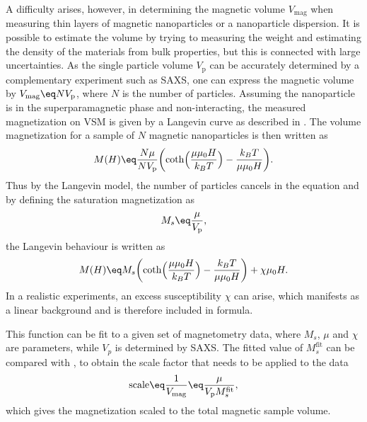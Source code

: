 \documentclass[\main/dresen_thesis.tex]{subfiles}
\begin{document}
    A difficulty arises, however, in determining the magnetic volume $V_\mathrm{mag}$ when measuring thin layers of magnetic nanoparticles or a nanoparticle dispersion.
    It is possible to estimate the volume by trying to measuring the weight and estimating the density of the materials from bulk properties, but this is connected with large uncertainties.
    As the single particle volume $V_\mathrm{p}$ can be accurately determined by a complementary experiment such as SAXS, one can express the magnetic volume by $V_\mathrm{mag} \eq N V_\mathrm{p}$, where $N$ is the number of particles.
    Assuming the nanoparticle is in the superparamagnetic phase and non-interacting, the measured magnetization on VSM is given by a Langevin curve as described in .
    The volume magnetization for a sample of $N$ magnetic nanoparticles is then written as
    \begin{align}
      M (H)\eq \frac{N \mu}{N V_\mathrm{p}}
      \biggl( \coth\Bigl(\frac{\mu \mu_0 H}{k_B T} \Bigr) - \frac{k_B T}{\mu \mu_0 H} \biggr).
    \end{align}
    Thus by the Langevin model, the number of particles cancels in the equation and by defining the saturation magnetization as
    \begin{align}
      \label{eq:methods:vsm:MsDefinition}
      M_s \eq \frac{\mu}{V_\mathrm{p}},
    \end{align}
    the Langevin behaviour is written as
    \begin{align}
      \label{eq:methods:vsm:scaleMagnetization}
      M(H) \eq M_s
       \biggl( \coth\Bigl(\frac{\mu \mu_0 H}{k_B T} \Bigr) - \frac{k_B T}{\mu \mu_0 H} \biggr) + \chi \mu_0 H.
    \end{align}
    In a realistic experiments, an excess susceptibility $\chi$ can arise, which manifests as a linear background and is therefore included in formula.

    This function can be fit to a given set of magnetometry data, where $M_s$, $\mu$ and $\chi$ are parameters, while $V_p$ is determined by SAXS.
    The fitted value of $M_s^\mathrm{fit}$ can be compared with , to obtain the scale factor that needs to be applied to the data
    \begin{align}
      \mathrm{scale} \eq \frac{1}{V_\mathrm{mag}} \eq \frac{\mu}{V_\mathrm{p} M_s^\mathrm{fit}},
    \end{align}
    which gives the magnetization scaled to the total magnetic sample volume.
\end{document}
